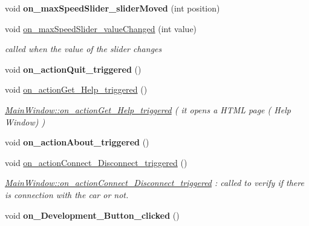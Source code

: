\begin{DoxyCompactItemize}
\item 
\hypertarget{class_main_window_a767ec2866317dfbdcc48dafa1864af4d}{}void {\bfseries on\+\_\+max\+Speed\+Slider\+\_\+slider\+Moved} (int position)\label{class_main_window_a767ec2866317dfbdcc48dafa1864af4d}

\item 
void \hyperlink{class_main_window_abf516f6eaf5bff5bbd76449f5c0d63ef}{on\+\_\+max\+Speed\+Slider\+\_\+value\+Changed} (int value)
\begin{DoxyCompactList}\small\item\em called when the value of the slider changes \end{DoxyCompactList}\item 
\hypertarget{class_main_window_aa68eba140c2cf5c1cd2b4bd81337fa83}{}void {\bfseries on\+\_\+action\+Quit\+\_\+triggered} ()\label{class_main_window_aa68eba140c2cf5c1cd2b4bd81337fa83}

\item 
\hypertarget{class_main_window_aad8b3565829ef596ac57aa46253b306b}{}void \hyperlink{class_main_window_aad8b3565829ef596ac57aa46253b306b}{on\+\_\+action\+Get\+\_\+\+Help\+\_\+triggered} ()\label{class_main_window_aad8b3565829ef596ac57aa46253b306b}

\begin{DoxyCompactList}\small\item\em \hyperlink{class_main_window_aad8b3565829ef596ac57aa46253b306b}{Main\+Window\+::on\+\_\+action\+Get\+\_\+\+Help\+\_\+triggered} ( it opens a H\+T\+M\+L page ( Help Window) ) \end{DoxyCompactList}\item 
\hypertarget{class_main_window_a4f3ebda1ba39e0ef4d678b44893c9c7f}{}void {\bfseries on\+\_\+action\+About\+\_\+triggered} ()\label{class_main_window_a4f3ebda1ba39e0ef4d678b44893c9c7f}

\item 
\hypertarget{class_main_window_a4bb83ab10a82172751db9f859a605016}{}void \hyperlink{class_main_window_a4bb83ab10a82172751db9f859a605016}{on\+\_\+action\+Connect\+\_\+\+Disconnect\+\_\+triggered} ()\label{class_main_window_a4bb83ab10a82172751db9f859a605016}

\begin{DoxyCompactList}\small\item\em \hyperlink{class_main_window_a4bb83ab10a82172751db9f859a605016}{Main\+Window\+::on\+\_\+action\+Connect\+\_\+\+Disconnect\+\_\+triggered} \+: called to verify if there is connection with the car or not. \end{DoxyCompactList}\item 
\hypertarget{class_main_window_a1c2ee7f6950fb7b597549563d002111e}{}void {\bfseries on\+\_\+\+Development\+\_\+\+Button\+\_\+clicked} ()\label{class_main_window_a1c2ee7f6950fb7b597549563d002111e}


\end{DoxyCompactItemize}
